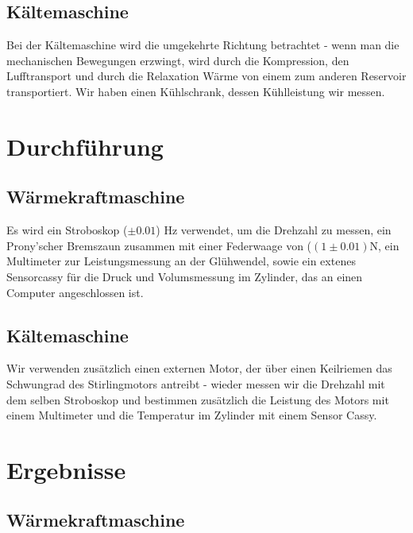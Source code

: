 \documentclass[12pt,a4paper,twopage]{article}
\begin{document}
\subsection{Kältemaschine}
Bei der Kältemaschine wird die umgekehrte Richtung betrachtet - wenn man die mechanischen Bewegungen erzwingt, wird durch die Kompression, den Lufftransport und durch die Relaxation Wärme von einem zum anderen Reservoir transportiert. Wir haben einen Kühlschrank, dessen Kühlleistung wir messen.


\section{Durchführung}

\subsection{Wärmekraftmaschine}
Es wird ein Stroboskop ($\pm 0.01$) Hz verwendet, um die Drehzahl zu messen, ein Prony'scher Bremszaun zusammen mit einer Federwaage von ($(1 \pm 0.01)$N, ein Multimeter zur Leistungsmessung an der Glühwendel, sowie ein extenes Sensorcassy für die Druck und Volumsmessung im Zylinder, das an einen Computer angeschlossen ist.
\subsection{Kältemaschine}
Wir verwenden zusätzlich einen externen Motor, der über einen Keilriemen das Schwungrad des Stirlingmotors antreibt - wieder messen wir die Drehzahl mit dem selben Stroboskop und bestimmen zusätzlich die Leistung des Motors mit einem Multimeter und die Temperatur im Zylinder mit einem Sensor Cassy.
\section{Ergebnisse}
\subsection{Wärmekraftmaschine}
\end{document}

